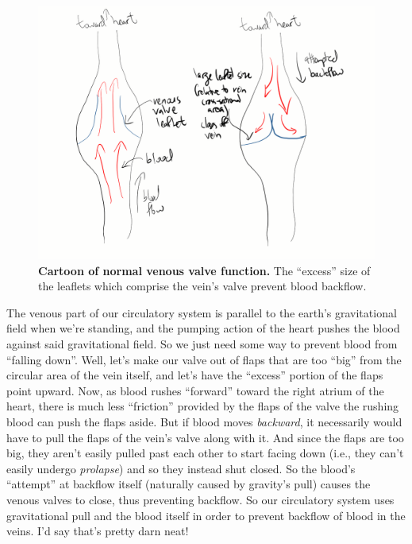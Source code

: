 \documentclass[../main/main.tex]{subfiles}
\begin{document}
\begin{figure}
\centering
\includegraphics[width=1.0\linewidth]{../img/engineering/vein_valve_function.png}
\caption{
\textbf{Cartoon of normal venous valve function.}
The ``excess'' size of the leaflets which comprise
the vein's valve prevent blood backflow.
}
\label{fig:vein-valve-function}
\end{figure}

The venous part of our circulatory
system is parallel to the earth's gravitational field when we're
standing, and the pumping action of the heart pushes the blood
against said gravitational field. So we just need some way
to prevent blood from ``falling down''.
Well, let's make our valve out of flaps that are too ``big''
from the circular area of the vein itself, and let's
have the ``excess'' portion of the flaps point upward.
Now, as blood rushes ``forward''
toward the right atrium of the heart,
there is much less ``friction'' provided by the flaps
of the valve \textemdash{} the rushing blood can
push the flaps aside.
But if blood moves \emph{backward}, it necessarily
would have to pull the flaps of the vein's valve along
with it. And since the flaps are too big, they aren't easily
pulled past each other to start facing down
(i.e., they can't easily undergo \emph{prolapse})
and so they instead shut closed. So the blood's ``attempt''
at backflow itself (naturally caused by
gravity's pull) causes the venous valves to close,
thus preventing backflow.
So our circulatory system uses gravitational pull
and the blood itself in order to prevent backflow of blood
in the veins. I'd say that's pretty darn neat!
\end{document}
